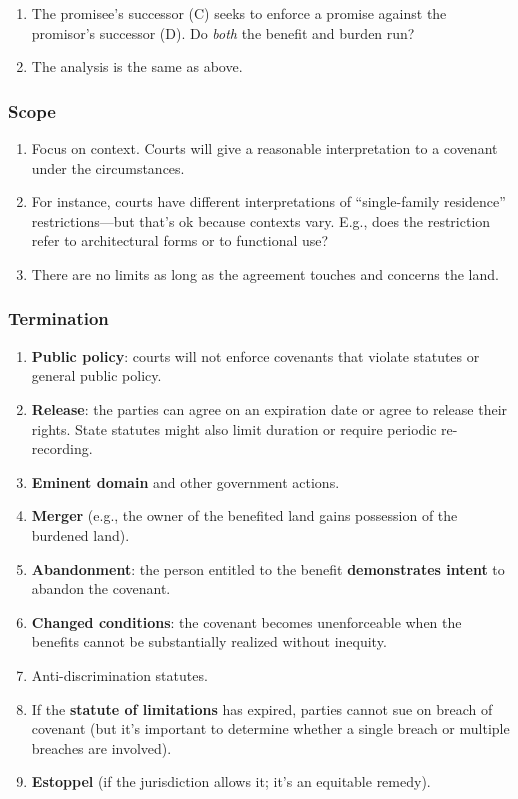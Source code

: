 \begin{enumerate}
    \item The promisee's successor (C) seeks to enforce a promise against the 
    promisor's successor (D). Do \emph{both} the benefit and burden run?
    \item The analysis is the same as above.
\end{enumerate}

\subsubsection{Scope}

\begin{enumerate}
    \item Focus on context. Courts will give a reasonable interpretation to a 
    covenant under the circumstances.
    \item For instance, courts have different interpretations of 
    ``single-family residence'' restrictions---but that's ok because contexts 
    vary. E.g., does the restriction refer to architectural forms or to 
    functional use? %
    \item There are no limits as long as the agreement touches and concerns 
    the land.
\end{enumerate}

\subsubsection{Termination}

\begin{enumerate}
    \item \textbf{Public policy}: courts will not enforce covenants that 
    violate statutes or general public policy.
    \item \textbf{Release}: the parties can agree on an expiration date or 
    agree to release their rights. State statutes might also limit duration or 
    require periodic re-recording.
    \item \textbf{Eminent domain} and other government actions.
    \item \textbf{Merger} (e.g., the owner of the benefited land gains 
    possession of the burdened land).
    \item \textbf{Abandonment}: the person entitled to the benefit 
    \textbf{demonstrates intent} to abandon the covenant.
    \item \textbf{Changed conditions}: the covenant becomes unenforceable when 
    the benefits cannot be substantially realized without inequity.
    \item Anti-discrimination statutes.
    \item If the \textbf{statute of limitations} has expired, parties cannot 
    sue on breach of covenant (but it's important to determine whether a 
    single breach or multiple breaches are involved).
    \item \textbf{Estoppel} (if the jurisdiction allows it; it's an equitable 
    remedy).
\end{enumerate}

